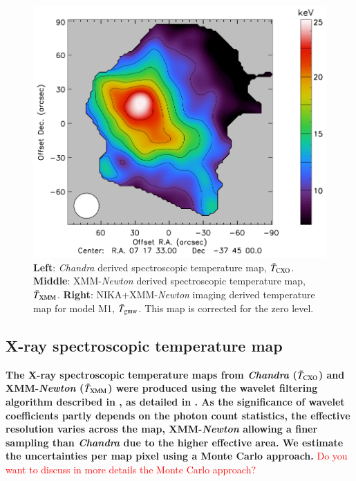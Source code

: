 \documentclass[twocolumn,traditabstract]{aa}
\begin{document}
\begin{figure}[h]
\includegraphics[trim=1.6cm 0cm 0cm 0cm, clip=true, totalheight=6.7cm]{Figure/Thermo_TSZclean1.pdf}
\caption{\footnotesize{{\bf Left}: \textit{Chandra} derived spectroscopic temperature map, $\bar{T}_{\rm CXO}$. {\bf Middle}: XMM-\textit{Newton} derived spectroscopic temperature map, $\bar{T}_{\rm XMM}$. {\bf Right}: NIKA+XMM-\textit{Newton} imaging derived temperature map for model M1, $\bar{T}_{\rm gmw}$. This map is corrected for the zero level.}}
\label{fig:T_maps}
\end{figure}

\subsection{X-ray spectroscopic temperature map}\label{sec:Xray_spectroscopic_temperature_map}
{\bf The X-ray spectroscopic temperature maps from \textit{Chandra} ($\bar{T}_{\rm CXO}$) and XMM-\textit{Newton} ($\bar{T}_{\rm XMM}$) were produced using the wavelet filtering algorithm described in \cite{Bourdin2008}, as detailed in \cite{Adam2016b}. As the significance of wavelet coefficients partly depends on the photon count statistics, the effective resolution varies across the map, XMM-\textit{Newton} allowing a finer sampling than \textit{Chandra} due to the higher effective area. We estimate the uncertainties per map pixel using a Monte Carlo approach.} \textcolor{red}{Do you want to discuss in more details the Monte Carlo approach?}

\end{document}

